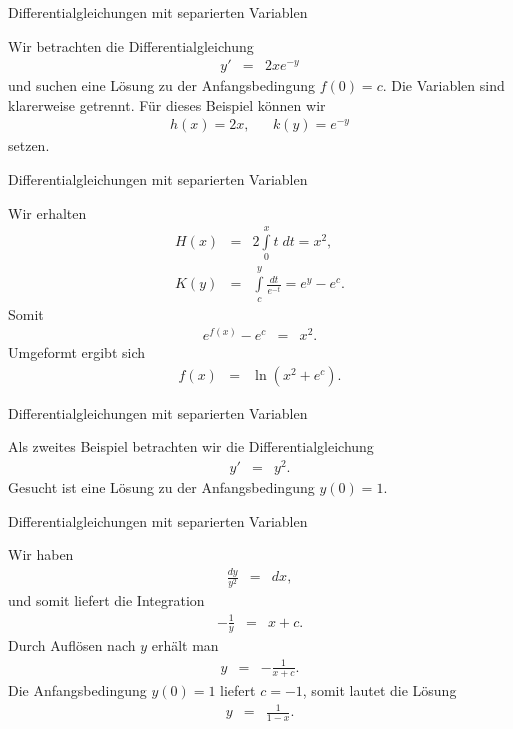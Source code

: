 \documentclass[german]{beamer}
\newcommand{\bq}{\begin{eqnarray*}}
\newcommand{\eq}{\end{eqnarray*}}
\begin{document}
\begin{frame}{Differentialgleichungen mit separierten Variablen}

\begin{example}
Wir betrachten die Differentialgleichung
\bq
 y' & = & 2 x e^{-y}
\eq
und suchen eine L\"osung zu der Anfangsbedingung $f(0)=c$.
Die Variablen sind klarerweise getrennt.
F\"ur dieses Beispiel k\"onnen wir
\bq
 h(x) = 2x, 
 & &
 k(y) = e^{-y}
\eq
setzen. 
\end{example}

\end{frame}

\begin{frame}{Differentialgleichungen mit separierten Variablen}

Wir erhalten
\bq
 H(x) & = & 2 \int\limits_0^x t \; dt = x^2,
 \nonumber \\
 K(y) & = & \int\limits_{c}^y \frac{dt}{e^{-t}} = e^y - e^c.
\eq
Somit
\bq
 e^{f(x)} - e^c & = & x^2.
\eq
Umgeformt ergibt sich
\bq
 f(x) & = & \ln\left( x^2 + e^c \right).
\eq

\end{frame}

\begin{frame}{Differentialgleichungen mit separierten Variablen}

\begin{example}
Als zweites Beispiel betrachten wir die Differentialgleichung
\bq
 y' & = & y^2.
\eq
Gesucht ist eine L\"osung zu der Anfangsbedingung $y(0)=1$.
\end{example}

\end{frame}

\begin{frame}{Differentialgleichungen mit separierten Variablen}

Wir haben
\bq
 \frac{dy}{y^2} & = & dx,
\eq
und somit liefert die Integration
\bq
 - \frac{1}{y} & = & x + c.
\eq
Durch Aufl\"osen nach $y$ erh\"alt man
\bq
 y & = & - \frac{1}{x+c}.
\eq
Die Anfangsbedingung $y(0)=1$ liefert $c=-1$, somit lautet die L\"osung
\bq
 y & = & \frac{1}{1-x}.
\eq

\end{frame}


\begin{frame}

\end{frame}
\end{document}
